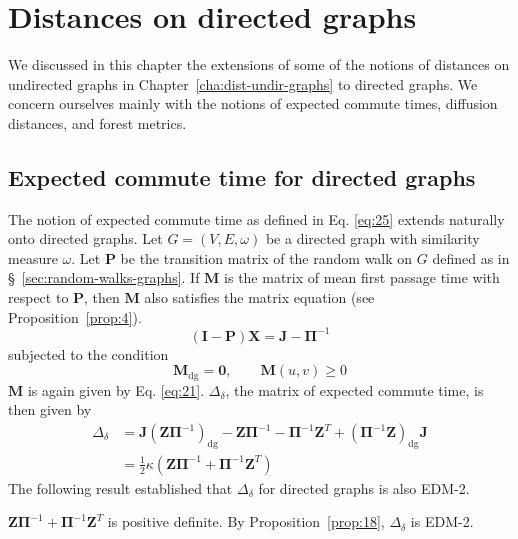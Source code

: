 \chapter{Distances on directed graphs}
\label{cha:dist-direct-graphs}
We discussed in this chapter the extensions of some of the notions of
distances on undirected graphs in Chapter~\ref{cha:dist-undir-graphs}
to directed graphs. We concern ourselves mainly with the notions of
expected commute times, diffusion distances, and forest metrics. 
\section{Expected commute time for directed graphs}
\label{sec:expect-comm-time-1}
The notion of expected commute time as defined in
Eq. \eqref{eq:25} extends naturally onto directed graphs. Let $G =
(V,E,\omega)$ be a directed graph with similarity measure
$\omega$. Let $\mathbf{P}$ be the transition matrix of the random walk
on $G$ defined as in \S~\ref{sec:random-walks-graphs}. 
If $\mathbf{M}$ is the matrix of mean first passage time with respect
to $\mathbf{P}$, then $\mathbf{M}$ also satisfies the matrix equation
(see Proposition~\ref{prop:4}). 
\begin{equation*}
  (\mathbf{I} - \mathbf{P})\mathbf{X} = \mathbf{J} - \bm{\Pi}^{-1}
\end{equation*}
subjected to the condition 
\begin{equation*}
  \mathbf{M}_{\mathrm{dg}} = \mathbf{0}, \qquad \mathbf{M}(u,v) \geq 0   
\end{equation*}
$\mathbf{M}$ is again given by
Eq. \eqref{eq:21}. $\Delta_{\delta}$, the matrix of expected commute
time, is then given by
\begin{equation}
  \label{eq:73}
  \begin{split}
    \Delta_\delta &= \mathbf{J}(\mathbf{Z}\bm{\Pi}^{-1})_{\mathrm{dg}}
    - \mathbf{Z}\bm{\Pi}^{-1} - \bm{\Pi}^{-1}\mathbf{Z}^{T} +
    (\bm{\Pi}^{-1}\mathbf{Z})_{\mathrm{dg}}\mathbf{J} \\ \ &=
    \tfrac{1}{2}\kappa(\mathbf{Z}\bm{\Pi}^{-1} +
    \mathbf{\Pi}^{-1}\mathbf{Z}^{T})
  \end{split}
\end{equation}
% 
The following result established that $\Delta_{\delta}$ for directed
graphs is also EDM-2.
\begin{proposition}
  \label{prop:19}
  $\mathbf{Z}\bm{\Pi}^{-1} + \bm{\Pi}^{-1}\mathbf{Z}^{T}$ is
  positive definite. By Proposition~\ref{prop:18},
  $\Delta_{\delta}$ is EDM-2.  
\end{proposition}
